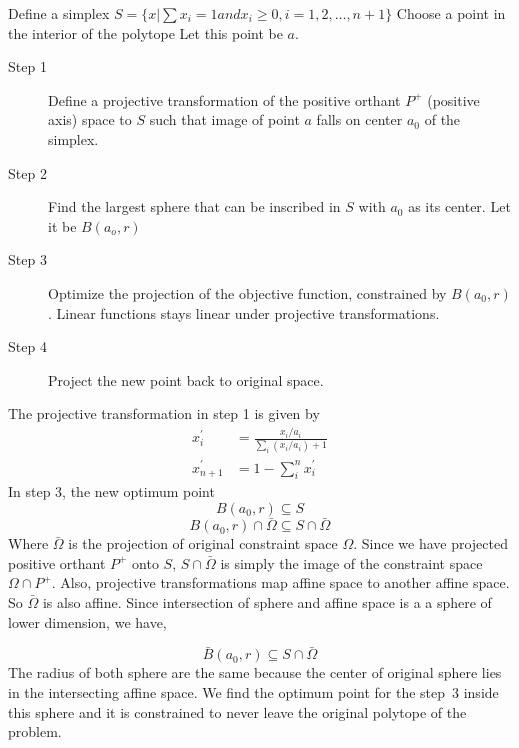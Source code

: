 \documentclass[10pt]{article}
\begin{document}
Define a simplex $S=\{x| \sum x_i = 1 and x_i\geq 0, i=1,2,\dots,n+1\}$
Choose a point in the interior of the polytope Let this point be $a$.
\begin{description}
\item[Step 1] Define a projective transformation of the positive orthant $P^+$ (positive axis) space to $S$ such that image of point $a$ falls on center $a_0$ of the simplex.
\item[Step 2] Find the largest sphere that can be inscribed in $S$ with $a_0$ as its center. Let it be $B(a_o,r)$
\item[Step 3] Optimize the projection of the objective function, constrained by $B(a_0,r)$. 
Linear functions stays linear under projective transformations.
\item[Step 4]  Project the new point back to original space.
\end{description}

The projective transformation in step 1 is given by
\begin{align*}
x_i^\prime &= \frac{x_i/a_i}{\sum_i(x_i/a_i) +1}\\
x^\prime_{n+1} &= 1-\sum_i^nx_i^\prime
\end{align*}
In step 3, the new optimum point 
$$	B(a_0,r)\subseteq S$$
$$B(a_0,r)\cap \bar{\Omega} \subseteq S\cap \bar{\Omega}$$
Where $\bar\Omega$ is the projection of original constraint space $\Omega$. Since we have projected positive orthant $P^+$ onto $S$, $S\cap \bar{\Omega}$ is simply the image of the constraint space $\Omega \cap P^+$. Also,  projective transformations map affine space to another affine space. So $\bar{\Omega}$ is also affine. Since intersection of sphere and affine space is a a sphere of lower dimension, we have,

$$\bar{B}(a_0,r)\subseteq S\cap \bar{\Omega}$$
The radius of both sphere are the same because the center of original sphere lies in the intersecting affine space. We find the optimum point for the step~3 inside this sphere and it is constrained to never leave the original polytope of the problem.
\end{document}
